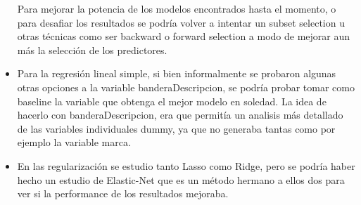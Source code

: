 \begin{itemize}
  Para mejorar la potencia de los modelos encontrados hasta el momento, o para desafiar los resultados se podría volver a intentar un subset selection u otras técnicas como ser backward o forward selection a modo de mejorar aun más la selección de los predictores.
  \item Para la regresión lineal simple, si bien informalmente se probaron algunas otras opciones a la variable banderaDescripcion, se podría probar tomar como baseline la variable que obtenga el mejor modelo en soledad. La idea de hacerlo con banderaDescripcion, era que permitía un analisis más detallado de las variables individuales dummy, ya que no generaba tantas como por ejemplo la variable marca.
  \item En las regularización se estudio tanto Lasso como Ridge, pero se podría haber hecho un estudio de Elastic-Net que es un método hermano a ellos dos para ver si la performance de los resultados mejoraba.

\end{itemize}